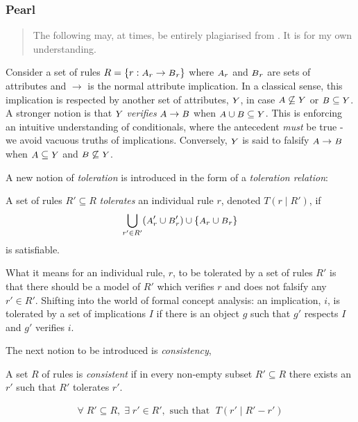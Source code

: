 \subsubsection{Pearl}
\label{rankings| pearl}
\begin{quote}
    The following may, at times, be entirely plagiarised from \cite{Pearl:1990}. It is for my own understanding.
\end{quote}
%
Consider a set of rules $R = \{r:{\A_r \rightarrow \B_r}\}$ where $\A_r$ and $\B_r$ are sets of attributes and $\rightarrow$ is the normal attribute implication. In a classical sense, this implication is respected by another set of attributes, $\Y$, in case ${\A} \not \subseteq \Y$ or ${\B} \subseteq \Y$. A stronger notion is that $\Y$ \textit{verifies} ${\A} \rightarrow {\B}$ when ${\A} \cup {\B} \subseteq \Y$. This is enforcing an intuitive understanding of conditionals, where the antecedent \textit{must} be true - we avoid vacuous truths of implications. \cite{Pearl:1990} Conversely, $\Y$ is said to falsify ${\A} \rightarrow {\B}$ when ${\A} \subseteq \Y$ and ${\B} \not \subseteq \Y$.

A new notion of \textit{toleration} is introduced in the form of a \textit{toleration relation}:
%
\begin{definition}
    A set of rules $R' \subseteq R$ \textit{tolerates} an individual rule $r$, denoted $T(r\mid R')$, if \[\bigcup\limits_{r' \in R'} ({\A_r' \cup \B_r'}) \cup \{{\A_r \cup \B_r}\}\] is satisfiable.
\end{definition}
%
What it means for an individual rule, $r$, to be tolerated by a set of rules $R'$ is that there should be a model of $R'$ which verifies $r$ and does not falsify any $r' \in R'$. Shifting into the world of formal concept analysis: an implication, $i$, is tolerated by a set of implications $I$ if there is an object $g$ such that $g'$ respects $I$ and $g'$ verifies $i$.

The next notion to be introduced is \textit{consistency},
\begin{definition}
    A set $R$ of rules is \textit{consistent} if in every non-empty subset $R' \subseteq R$ there exists an $r'$ such that $R'$ tolerates $r'$.
\end{definition}
%
\begin{align}
    \forall \; R' \subseteq R, \; \exists \; r' \in R', \text{ such that } \; T(r'\mid R' - r')
\end{align}

